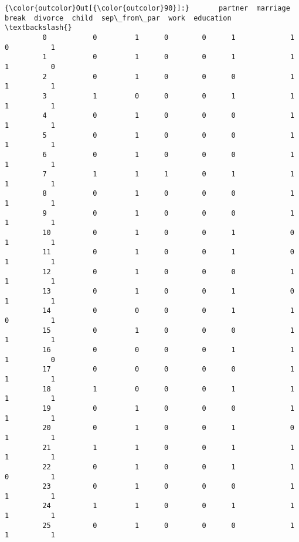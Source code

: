 \documentclass[11pt]{article}
\begin{document}
\begin{Verbatim}[commandchars=\\\{\}]
{\color{outcolor}Out[{\color{outcolor}90}]:}       partner  marriage  break  divorce  child  sep\_from\_par  work  education  \textbackslash{}
         0           0         1      0        0      1             1     0          1   
         1           0         1      0        0      1             1     1          0   
         2           0         1      0        0      0             1     1          1   
         3           1         0      0        0      1             1     1          1   
         4           0         1      0        0      0             1     1          1   
         5           0         1      0        0      0             1     1          1   
         6           0         1      0        0      0             1     1          1   
         7           1         1      1        0      1             1     1          1   
         8           0         1      0        0      0             1     1          1   
         9           0         1      0        0      0             1     1          1   
         10          0         1      0        0      1             0     1          1   
         11          0         1      0        0      1             0     1          1   
         12          0         1      0        0      0             1     1          1   
         13          0         1      0        0      1             0     1          1   
         14          0         0      0        0      1             1     0          1   
         15          0         1      0        0      0             1     1          1   
         16          0         0      0        0      1             1     1          0   
         17          0         0      0        0      0             1     1          1   
         18          1         0      0        0      1             1     1          1   
         19          0         1      0        0      0             1     1          1   
         20          0         1      0        0      1             0     1          1   
         21          1         1      0        0      1             1     1          1   
         22          0         1      0        0      1             1     0          1   
         23          0         1      0        0      0             1     1          1   
         24          1         1      0        0      1             1     1          1   
         25          0         1      0        0      0             1     1          1   

\end{Verbatim}
\end{document}
